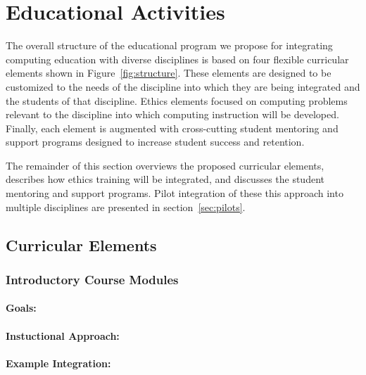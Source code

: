 \section{Educational Activities}
\label{sec:approach}

The overall structure of the educational program we propose for integrating computing education with diverse disciplines is based on four flexible curricular elements shown in Figure~\ref{fig:structure}. These elements are designed to be customized to the needs of the  discipline into which they are being integrated and the students of that discipline. Ethics elements focused on computing problems relevant to the discipline into which computing instruction will be developed. Finally, each element is augmented with cross-cutting student mentoring and support programs designed to increase student success and retention. 

The remainder of this section overviews the proposed curricular elements, describes how ethics training will be integrated, and discusses the student mentoring and support programs. Pilot integration of these this approach into multiple disciplines are presented in section~\ref{sec:pilots}.

\subsection{Curricular Elements}

\subsubsection{Introductory Course Modules}
\paragraph{Goals:}
\paragraph{Instuctional Approach:}
\paragraph{Example Integration:}

